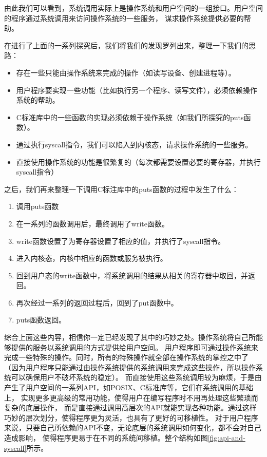 由此我们可以看到，系统调用实际上是操作系统和用户空间的一组接口。用户空间的程序通过系统调用来访问操作系统的一些服务，
谋求操作系统提供必要的帮助。

在进行了上面的一系列探究后，我们将我们的发现罗列出来，整理一下我们的思路：
\begin{itemize}
  \item 存在一些只能由操作系统来完成的操作（如读写设备、创建进程等）。
  \item 用户程序要实现一些功能（比如执行另一个程序、读写文件），必须依赖操作系统的帮助。
  \item C标准库中的一些函数的实现必须依赖于操作系统（如我们所探究的puts函数）。
  \item 通过执行syscall指令，我们可以陷入到内核态，请求操作系统的一些服务。
  \item 直接使用操作系统的功能是很繁复的（每次都需要设置必要的寄存器，并执行syscall指令）
\end{itemize}

之后，我们再来整理一下调用C标注库中的puts函数的过程中发生了什么：
\begin{enumerate}
  \item 调用puts函数
  \item 在一系列的函数调用后，最终调用了write函数。
  \item write函数设置了为寄存器设置了相应的值，并执行了syscall指令。
  \item 进入内核态，内核中相应的函数或服务被执行。
  \item 回到用户态的write函数中，将系统调用的结果从相关的寄存器中取回，并返回。
  \item 再次经过一系列的返回过程后，回到了put函数中。
  \item puts函数返回。
\end{enumerate}

综合上面这些内容，相信你一定已经发现了其中的巧妙之处。操作系统将自己所能够提供的服务以系统调用的方式提供给用户空间。
用户程序即可通过操作系统来完成一些特殊的操作。同时，所有的特殊操作就全部在操作系统的掌控之中了
（因为用户程序只能通过由操作系统提供的系统调用来完成这些操作，所以操作系统可以确保用户不破坏系统的稳定）。
而直接使用这些系统调用较为麻烦，于是由产生了用户空间的一系列API，如POSIX、C标准库等，它们在系统调用的基础上，
实现更多更高级的常用功能，使得用户在编写程序时不用再处理这些繁琐而复杂的底层操作，
而是直接通过调用高层次的API就能实现各种功能。通过这样巧妙的层次划分，使得程序更为灵活，也具有了更好的可移植性。
对于用户程序来说，只要自己所依赖的API不变，无论底层的系统调用如何变化，都不会对自己造成影响，
使得程序更易于在不同的系统间移植。整个结构如图\ref{fig:api-and-syscall}所示。

